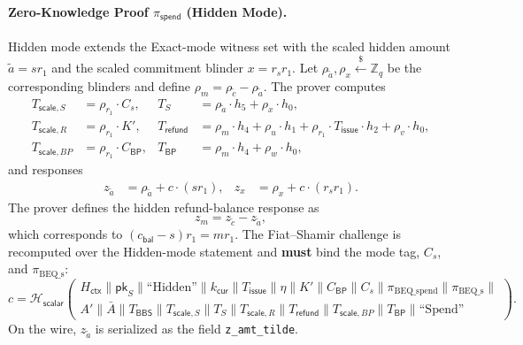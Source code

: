 \documentclass[11pt]{article}
\theoremstyle{definitionstyle}
\theoremstyle{plain}
\begin{document}
\paragraph{Zero-Knowledge Proof $\pi_{\mathsf{spend}}$ (Hidden Mode).}
Hidden mode extends the Exact-mode witness set with the scaled hidden amount $\widetilde{a} = s r_1$ and the scaled commitment blinder $x = r_s r_1$. Let $\rho_{\widetilde{a}}, \rho_x \xleftarrow{\$} \mathbb{Z}_q$ be the corresponding blinders and define $\rho_m = \rho_{\tilde{c}} - \rho_{\widetilde{a}}$. The prover computes
\begin{align*}
T_{\mathsf{scale},S} &= \rho_{r_1} \cdot C_s, & T_S &= \rho_{\widetilde{a}} \cdot h_5 + \rho_x \cdot h_0, \\
T_{\mathsf{scale},R} &= \rho_{r_1} \cdot K', & T_{\mathsf{refund}} &= \rho_m \cdot h_4 + \rho_u \cdot h_1 + \rho_{r_1} \cdot T_{\mathsf{issue}} \cdot h_2 + \rho_v \cdot h_0, \\
T_{\mathsf{scale},BP} &= \rho_{r_1} \cdot C_{\mathsf{BP}}, & T_{\mathsf{BP}} &= \rho_m \cdot h_4 + \rho_w \cdot h_0,
\end{align*}
and responses
\begin{align*}
z_{\widetilde{a}} &= \rho_{\widetilde{a}} + c \cdot (s r_1), & z_x &= \rho_x + c \cdot (r_s r_1).
\end{align*}
The prover defines the hidden refund-balance response as
\[
z_m = z_{\tilde{c}} - z_{\widetilde{a}},
\]
which corresponds to $(c_{\mathsf{bal}} - s) r_1 = m r_1$. The Fiat--Shamir challenge is recomputed over the Hidden-mode statement and \textbf{must} bind the mode tag, $C_s$, and $\pi_{\text{BEQ\_s}}$:
\[
c = \mathcal{H}_{\mathsf{scalar}}\left(
\begin{array}{c}
H_{\mathsf{ctx}} \parallel \mathsf{pk}_S \parallel \text{``Hidden''} \parallel k_{\mathsf{cur}} \parallel T_{\mathsf{issue}} \parallel \eta \parallel K' \parallel C_{\mathsf{BP}} \parallel C_s \parallel \pi_{\text{BEQ\_spend}} \parallel \pi_{\text{BEQ\_s}} \parallel \\
A' \parallel \bar{A} \parallel T_{\mathsf{BBS}} \parallel T_{\mathsf{scale},S} \parallel T_S \parallel T_{\mathsf{scale},R} \parallel T_{\mathsf{refund}} \parallel T_{\mathsf{scale},BP} \parallel T_{\mathsf{BP}} \parallel \text{``Spend''}
\end{array}
\right).
\]
On the wire, $z_{\widetilde{a}}$ is serialized as the field
\texttt{z\_amt\_tilde}.
\end{document}
